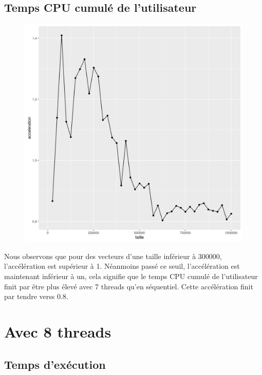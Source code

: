\documentclass[a4paper,11pt]{scrartcl}
\begin{document}
\subsection{Temps CPU cumul\'e de l'utilisateur}
\begin{figure}[H] \center
   \includegraphics[scale=0.5] {graphes/temps_user_accel7.png}
\end{figure}
Nous observons que pour des vecteurs d'une taille inf\'erieur \`a 300000, l'acc\'el\'eration est sup\'erieur \`a 1. N\'eanmoins pass\'e ce seuil,  l'acc\'el\'eration est maintenant inf\'erieur \`a un, cela signifie que le temps CPU cumul\'e de l'utilisateur finit par \^{e}tre plus \'elev\'e avec 7 threads qu'en s\'equentiel. Cette acc\'el\'eration finit par tendre verss 0.8.


\section{Avec 8 threads}
\subsection{Temps d'ex\'ecution}
\end{document}
